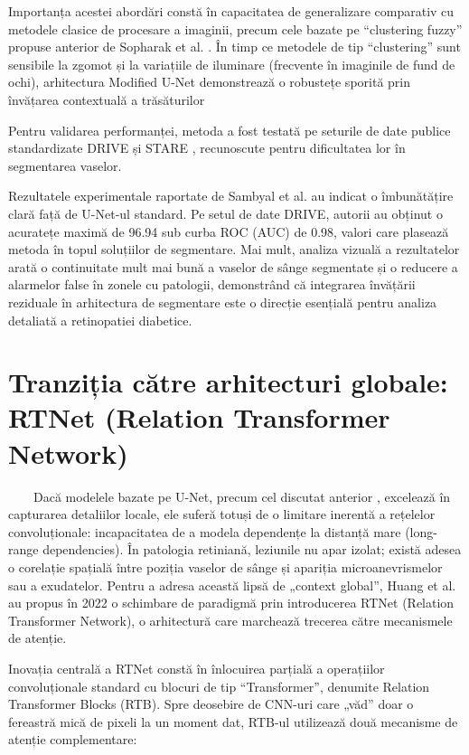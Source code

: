 \documentclass[12pt, a4paper, oneside, romanian]{teza-upb}
\begin{document}
Importanța acestei abordări constă în capacitatea de generalizare comparativ cu metodele
clasice de procesare a imaginii, precum cele bazate pe “clustering fuzzy” propuse anterior de Sopharak et
al. \cite{2_sopharak2009automatic}. În timp ce metodele de tip “clustering” sunt sensibile la zgomot și la variațiile de iluminare
(frecvente în imaginile de fund de ochi), arhitectura Modified U-Net demonstrează o robustețe sporită
prin învățarea contextuală a trăsăturilor
\bigskip

Pentru validarea performanței, metoda a fost testată pe seturile de date publice standardizate
DRIVE \cite{13_staal2004ridge} și STARE \cite{9_chetoui2020explainable}, recunoscute pentru dificultatea lor în segmentarea vaselor.

Rezultatele experimentale raportate de Sambyal et al. \cite{12_sambyal2020modified} au indicat o îmbunătățire clară față de
U-Net-ul standard. Pe setul de date DRIVE, autorii au obținut o acuratețe maximă de 96.94%
sub curba ROC (AUC) de 0.98, valori care plasează metoda în topul soluțiilor de segmentare. Mai mult,
analiza vizuală a rezultatelor arată o continuitate mult mai bună a vaselor de sânge segmentate și o
reducere a alarmelor false în zonele cu patologii, demonstrând că integrarea învățării reziduale în
arhitectura de segmentare este o direcție esențială pentru analiza detaliată a retinopatiei diabetice.

\section{Tranziția către arhitecturi globale: RTNet (Relation Transformer Network) \cite{7_huang2022rtnet}}

\ \ \ \ Dacă modelele bazate pe U-Net, precum cel discutat anterior \cite{12_sambyal2020modified}, excelează în capturarea
detaliilor locale, ele suferă totuși de o limitare inerentă a rețelelor convoluționale: incapacitatea de a
modela dependențe la distanță mare (long-range dependencies). În patologia retiniană, leziunile nu apar
izolat; există adesea o corelație spațială între poziția vaselor de sânge și apariția microanevrismelor sau a
exudatelor. Pentru a adresa această lipsă de „context global”, Huang et al. \cite{7_huang2022rtnet} au propus în 2022 o
schimbare de paradigmă prin introducerea RTNet (Relation Transformer Network), o arhitectură care
marchează trecerea către mecanismele de atenție.
\bigskip

Inovația centrală a RTNet constă în înlocuirea parțială a operațiilor convoluționale standard cu
blocuri de tip “Transformer”, denumite Relation Transformer Blocks (RTB). Spre deosebire de CNN-uri
care „văd” doar o fereastră mică de pixeli la un moment dat, RTB-ul utilizează două mecanisme de
atenție complementare:
\end{document}
